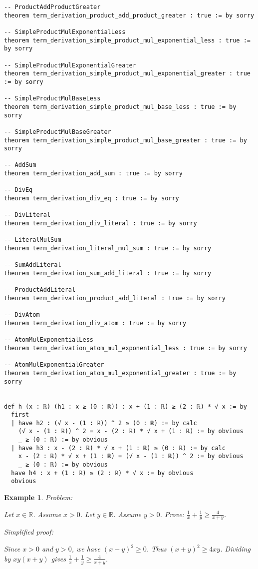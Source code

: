 \documentclass{article}
\newtheorem{example}{Example}
\begin{document}
\begin{tcolorbox}[colback=white!10, width=\linewidth]
\begin{lstlisting}[language=Lean4]
-- ProductAddProductGreater
theorem term_derivation_product_add_product_greater : true := by sorry

-- SimpleProductMulExponentialLess
theorem term_derivation_simple_product_mul_exponential_less : true := by sorry

-- SimpleProductMulExponentialGreater
theorem term_derivation_simple_product_mul_exponential_greater : true := by sorry

-- SimpleProductMulBaseLess
theorem term_derivation_simple_product_mul_base_less : true := by sorry

-- SimpleProductMulBaseGreater
theorem term_derivation_simple_product_mul_base_greater : true := by sorry

-- AddSum
theorem term_derivation_add_sum : true := by sorry

-- DivEq
theorem term_derivation_div_eq : true := by sorry

-- DivLiteral
theorem term_derivation_div_literal : true := by sorry

-- LiteralMulSum
theorem term_derivation_literal_mul_sum : true := by sorry

-- SumAddLiteral
theorem term_derivation_sum_add_literal : true := by sorry

-- ProductAddLiteral
theorem term_derivation_product_add_literal : true := by sorry

-- DivAtom
theorem term_derivation_div_atom : true := by sorry

-- AtomMulExponentialLess
theorem term_derivation_atom_mul_exponential_less : true := by sorry

-- AtomMulExponentialGreater
theorem term_derivation_atom_mul_exponential_greater : true := by sorry


def h (x : ℝ) (h1 : x ≥ (0 : ℝ)) : x + (1 : ℝ) ≥ (2 : ℝ) * √ x := by
  first
  | have h2 : (√ x - (1 : ℝ)) ^ 2 ≥ (0 : ℝ) := by calc
    (√ x - (1 : ℝ)) ^ 2 = x - (2 : ℝ) * √ x + (1 : ℝ) := by obvious
    _ ≥ (0 : ℝ) := by obvious
  | have h3 : x - (2 : ℝ) * √ x + (1 : ℝ) ≥ (0 : ℝ) := by calc
    x - (2 : ℝ) * √ x + (1 : ℝ) = (√ x - (1 : ℝ)) ^ 2 := by obvious
    _ ≥ (0 : ℝ) := by obvious
  have h4 : x + (1 : ℝ) ≥ (2 : ℝ) * √ x := by obvious
  obvious

\end{lstlisting}
\end{tcolorbox}


\begin{example}
Problem:
\begin{tcolorbox}[colback=yellow!10, width=\linewidth]
Let $x\in\mathbb{R}$. Assume $x>0$.
    Let $y\in\mathbb{R}$. Assume $y>0$.
    Prove: $\frac{1}{x} + \frac{1}{y} \ge \frac{4}{x+y}$.
\end{tcolorbox}

Simplified proof:
\begin{tcolorbox}[colback=blue!10, width=\linewidth]
Since $x>0$ and $y>0$, we have $(x-y)^2 \ge 0$. Thus $(x+y)^2 \ge 4xy$. Dividing by $xy(x+y)$ gives $\frac{1}{x}+\frac{1}{y} \ge \frac{4}{x+y}$.
\end{tcolorbox}
\end{example}
\end{document}
